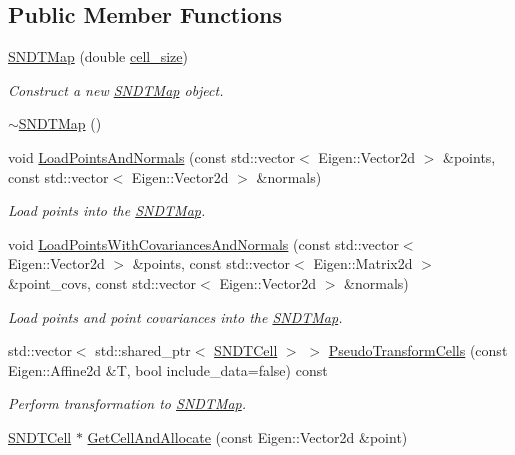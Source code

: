 \subsection*{Public Member Functions}
\begin{DoxyCompactItemize}
\item 
\hyperlink{classSNDTMap_a813681a71844eb9e8df6bb0a267f5e99}{S\+N\+D\+T\+Map} (double \hyperlink{test__match_8cc_a456553c1fc05d94c07e74c5fd45f6621}{cell\+\_\+size})
\begin{DoxyCompactList}\small\item\em Construct a new \hyperlink{classSNDTMap}{S\+N\+D\+T\+Map} object. \end{DoxyCompactList}\item 
\hyperlink{classSNDTMap_a84f70ba8ebdf71b84700bb3352f3bf4c}{$\sim$\+S\+N\+D\+T\+Map} ()
\item 
void \hyperlink{classSNDTMap_ad755706650d16e50957a9c7a7772f961}{Load\+Points\+And\+Normals} (const std\+::vector$<$ Eigen\+::\+Vector2d $>$ \&points, const std\+::vector$<$ Eigen\+::\+Vector2d $>$ \&normals)
\begin{DoxyCompactList}\small\item\em Load points into the \hyperlink{classSNDTMap}{S\+N\+D\+T\+Map}. \end{DoxyCompactList}\item 
void \hyperlink{classSNDTMap_afb229d2c2a8d58523743c0954fb8c0a8}{Load\+Points\+With\+Covariances\+And\+Normals} (const std\+::vector$<$ Eigen\+::\+Vector2d $>$ \&points, const std\+::vector$<$ Eigen\+::\+Matrix2d $>$ \&point\+\_\+covs, const std\+::vector$<$ Eigen\+::\+Vector2d $>$ \&normals)
\begin{DoxyCompactList}\small\item\em Load points and point covariances into the \hyperlink{classSNDTMap}{S\+N\+D\+T\+Map}. \end{DoxyCompactList}\item 
std\+::vector$<$ std\+::shared\+\_\+ptr$<$ \hyperlink{classSNDTCell}{S\+N\+D\+T\+Cell} $>$ $>$ \hyperlink{classSNDTMap_a64c45e8f2940a9037192b85b2aacd84b}{Pseudo\+Transform\+Cells} (const Eigen\+::\+Affine2d \&T, bool include\+\_\+data=false) const
\begin{DoxyCompactList}\small\item\em Perform transformation to \hyperlink{classSNDTMap}{S\+N\+D\+T\+Map}. \end{DoxyCompactList}\item 
\hyperlink{classSNDTCell}{S\+N\+D\+T\+Cell} $\ast$ \hyperlink{classSNDTMap_ad684a85e74b42f6aecdb42961789877e}{Get\+Cell\+And\+Allocate} (const Eigen\+::\+Vector2d \&point)

\end{DoxyCompactItemize}
